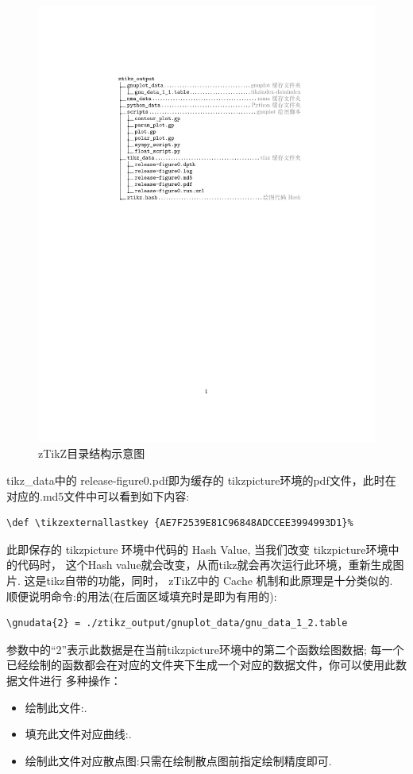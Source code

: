 \begin{figure}[!htb]
    \centering
    \includegraphics[width=.75\linewidth]{./pics/ztikz_tree.pdf}
    \caption{zTikZ目录结构示意图}
    \label{fig:zTikZ-directory}
\end{figure}

{tikz\_data}中的 {release-figure0.pdf}即为缓存的 {tikzpicture}环境的pdf文件，此时在
对应的{.md5}文件中可以看到如下内容:

\begin{verbatim}
\def \tikzexternallastkey {AE7F2539E81C96848ADCCEE3994993D1}%
\end{verbatim}

此即保存的 tikzpicture 环境中代码的 Hash Value, 当我们改变 {tikzpicture}环境中的代码时，
这个Hash value就会改变，从而tikz就会再次运行此环境，重新生成图片. 这是tikz自带的功能，同时，
zTikZ中的 Cache 机制和此原理是十分类似的. 顺便说明命令:\cmd{\gnudata}的用法(在后面区域填充时是即为有用的):

\begin{verbatim}
\gnudata{2} = ./ztikz_output/gnuplot_data/gnu_data_1_2.table
\end{verbatim}

\cmd{\gnudata}参数中的``2''表示此数据是在当前tikzpicture环境中的第二个函数绘图数据; 
每一个已经绘制的函数都会在对应的文件夹下生成一个对应的数据文件，你可以使用此数据文件进行
多种操作：
\begin{itemize}
    \item 绘制此文件:.
    \item 填充此文件对应曲线:.
    \item 绘制此文件对应散点图:只需在绘制散点图前指定绘制精度即可.
\end{itemize}

